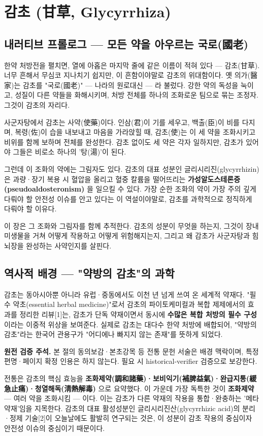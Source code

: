 \documentclass[11pt,oneside]{book}
\newenvironment{authnote}
  {\par\smallskip\begingroup\leftskip=7mm\rightskip=5mm\small\color{muted}\noindent\ignorespaces}
  {\par\endgroup\smallskip}
\begin{document}

\chapter{감초 (甘草, Glycyrrhiza)}

\section{내러티브 프롤로그 — 모든 약을 아우르는 국로(國老)}
한약 처방전을 펼치면, 열에 아홉은 마지막 줄에 같은 이름이 적혀 있다 — 감초(甘草). 너무 흔해서 무심코 지나치기 쉽지만, 이 흔함이야말로 감초의 위대함이다. 옛 의가(醫家)는 감초를 "국로(國老)" — 나라의 원로대신 — 라 불렀다. 강한 약의 독성을 눅이고, 성질이 다른 약들을 화해시키며, 처방 전체를 하나의 조화로운 팀으로 묶는 조정자. 그것이 감초의 자리다.

사군자탕에서 감초는 사약(使藥)이다. 인삼(君)이 기를 세우고, 백출(臣)이 비를 다지며, 복령(佐)이 습을 내보내고 마음을 가라앉힐 때, 감초(使)는 이 세 약을 조화시키고 비위를 함께 보하며 전체를 완성한다. 감초 없이도 세 약은 각자 일하지만, 감초가 있어야 그들은 비로소 하나의 '탕(湯)'이 된다.

그런데 이 조화의 약에는 그림자도 있다. 감초의 대표 성분인 글리시리진(glycyrrhizin)은 과량·장기 복용 시 혈압을 올리고 혈중 칼륨을 떨어뜨리는 \textbf{가성알도스테론증(pseudoaldosteronism)} 을 일으킬 수 있다. 가장 순한 조화의 약이 가장 주의 깊게 다뤄야 할 안전성 이슈를 안고 있다는 이 역설이야말로, 감초를 과학적으로 정직하게 다뤄야 할 이유다.

이 장은 그 조화와 그림자를 함께 추적한다. 감초의 성분이 무엇을 하는지, 그것이 장내미생물을 거쳐 어떻게 작용하고 어떻게 위험해지는지, 그리고 왜 감초가 사군자탕과 힘뇌장을 완성하는 사약인지를 살핀다.

\section{역사적 배경 — "약방의 감초"의 과학}
감초는 동아시아뿐 아니라 유럽·중동에서도 이천 년 넘게 쓰여 온 세계적 약재다. "필수 약초(essential herbal medicine)"로서 감초의 파이토케미컬과 복합 제제에서의 효과를 정리한 리뷰[1]는, 감초가 단독 약재이면서 동시에 \textbf{수많은 복합 처방의 필수 구성} 이라는 이중적 위상을 보여준다. 실제로 감초는 대다수 한약 처방에 배합되어, "약방의 감초"라는 한국어 관용구가 "어디에나 빠지지 않는 존재"를 뜻하게 되었다.

\begin{authnote}\textbf{원전 검증 주석.} 본 절의 동의보감·본초강목 등 전통 문헌 서술은 배경 맥락이며, 특정 편명·페이지 확정 인용은 하지 않는다. 필요 시 historical-verifier 검증으로 보강한다.\end{authnote}
전통은 감초의 핵심 효능을 \textbf{조화제약(調和諸藥)·보비익기(補脾益氣)·완급지통(緩急止痛)·청열해독(淸熱解毒)} 으로 요약했다. 이 가운데 가장 독특한 것이 \textbf{조화제약} — 여러 약을 조화시킴 — 이다. 이는 감초가 다른 약재의 작용을 통합·완충하는 '메타 약재'임을 지목한다. 감초의 대표 활성성분인 글리시리진산(glycyrrhizic acid)의 분리·정제 기술[2]이 오늘날에도 활발히 연구되는 것은, 이 성분이 감초 작용의 중심이자 안전성 이슈의 중심이기 때문이다.
\end{document}
